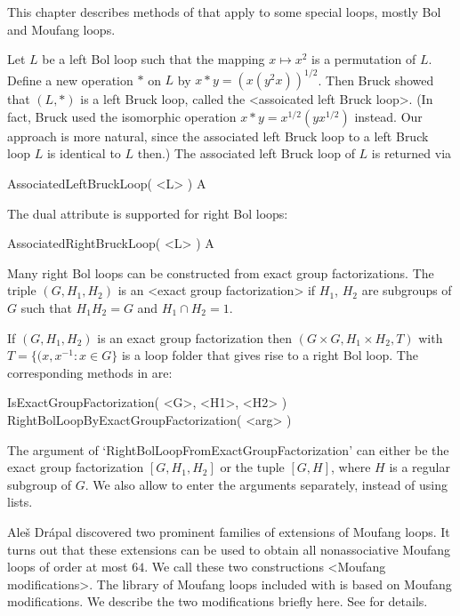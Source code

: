 
This chapter describes methods of {\LOOPS} that apply to some special loops,
mostly Bol and Moufang loops.


Let $L$ be a left Bol loop such that the mapping $x\mapsto
x^2$ is a permutation of $L$. Define a new operation $*$ on $L$ by $x*y
=(x(y^2x))^{1/2}$. Then Bruck showed that $(L,*)$ is a left Bruck loop, called
the <assoicated left Bruck loop>. (In fact,
Bruck used the isomorphic operation $x*y = x^{1/2}(yx^{1/2})$ instead. Our
approach is more natural, since the associated left Bruck loop to a left Bruck
loop $L$ is identical to $L$ then.) The associated left Bruck loop of $L$ is
returned via

\>AssociatedLeftBruckLoop( <L> ) A

The dual attribute is supported for right Bol loops:

\>AssociatedRightBruckLoop( <L> ) A

Many right Bol loops can be constructed from exact group factorizations. The triple $(G,H_1,H_2)$ is an <exact group factorization> if $H_1$, $H_2$ are subgroups of $G$ such that $H_1H_2=G$ and $H_1\cap H_2=1$.

If $(G,H_1,H_2)$ is an exact group factorization then $(G\times G, H_1\times H_2, T)$ with $T=\{(x,x^{-1} : x\in G\}$ is a loop folder that gives rise to a right Bol loop. The corresponding methods in {\LOOPS} are:

\>IsExactGroupFactorization( <G>, <H1>, <H2> )
\>RightBolLoopByExactGroupFactorization( <arg> )

The argument of `RightBolLoopFromExactGroupFactorization' can either be the exact group factorization $[G,H_1,H_2]$ or the tuple $[G,H]$, where $H$ is a regular subgroup of $G$. We also allow to enter the arguments separately, instead of using lists.


Ale\v{s} Dr\'apal discovered two prominent families of extensions of Moufang
loops. It turns out that these extensions can be used to obtain all
nonassociative Moufang loops of order at most $64$. We call these two
constructions <Moufang modifications>. The library
of Moufang loops included with {\LOOPS} is based on Moufang modifications. We
describe the two modifications briefly here. See \cite{DrVo} for details.

